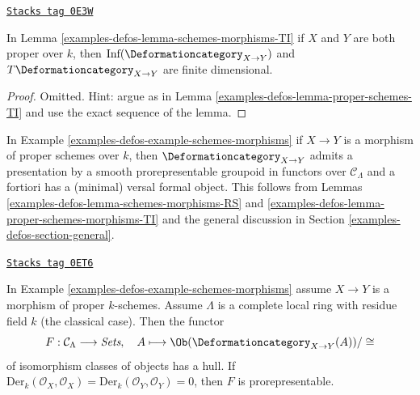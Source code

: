 \begin{lemma}
\label{examples-defos-lemma-proper-schemes-morphisms-TI}
\href{https://stacks.math.columbia.edu/tag/0E3W}{\texttt{Stacks tag 0E3W}}

In Lemma \ref{examples-defos-lemma-schemes-morphisms-TI} if $X$ and $Y$ are both
proper over $k$, then
$\text{Inf}(\Deformationcategory_{X \to Y})$ and
$T\Deformationcategory_{X \to Y}$ are finite dimensional.
\end{lemma}

\begin{proof}
Omitted. Hint: argue as in Lemma \ref{examples-defos-lemma-proper-schemes-TI}
and use the exact sequence of the lemma.
\end{proof}

In Example \ref{examples-defos-example-schemes-morphisms}
if $X \to Y$ is a morphism of proper schemes over $k$,
then $\Deformationcategory_{X \to Y}$
admits a presentation by a smooth prorepresentable groupoid in functors
over $\mathcal{C}_\Lambda$
and a fortiori has a (minimal) versal formal object. This follows
from Lemmas \ref{examples-defos-lemma-schemes-morphisms-RS} and
\ref{examples-defos-lemma-proper-schemes-morphisms-TI}
and the general discussion in Section \ref{examples-defos-section-general}.

\begin{lemma}
\label{examples-defos-lemma-schemes-morphisms-hull}
\href{https://stacks.math.columbia.edu/tag/0ET6}{\texttt{Stacks tag 0ET6}}

In Example \ref{examples-defos-example-schemes-morphisms} assume $X \to Y$
is a morphism of proper $k$-schemes.
Assume $\Lambda$ is a complete local ring with residue field $k$
(the classical case). Then the functor
$$
F : \mathcal{C}_\Lambda \longrightarrow \textit{Sets},\quad
A \longmapsto \Ob(\Deformationcategory_{X \to Y}(A))/\cong
$$
of isomorphism classes of objects has a hull. If
$\text{Der}_k(\mathcal{O}_X, \mathcal{O}_X) =
\text{Der}_k(\mathcal{O}_Y, \mathcal{O}_Y) = 0$, then
$F$ is prorepresentable.
\end{lemma}

